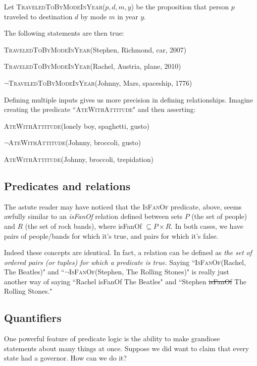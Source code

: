 \quad\quad Let \textsc{TraveledToByModeInYear}($p,d,m,y$) be the
proposition that person $p$ traveled to destination $d$ by mode $m$ in year
$y$.

The following statements are then true:
\begin{center}
\textsc{TraveledToByModeInYear}(Stephen, Richmond, car, 2007) 

\textsc{TraveledToByModeInYear}(Rachel, Austria, plane, 2010) 

$\neg$\textsc{TraveledToByModeInYear}(Johnny, Mars, spaceship, 1776) 
\end{center}

Defining multiple inputs gives us more precision in defining relationships.
Imagine creating the predicate ``\textsc{AteWithAttitude}" and then
asserting:
\begin{center}
\textsc{AteWithAttitude}(lonely boy, spaghetti, gusto)

$\neg$\textsc{AteWithAttitude}(Johnny, broccoli, gusto)

\textsc{AteWithAttitude}(Johnny, broccoli, trepidation)
\end{center}


\subsection{Predicates and relations}

The astute reader may have noticed that the \textsc{IsFanOf} predicate,
above, seems awfully similar to an \textsl{isFanOf} relation defined
between sets $P$ (the set of people) and $R$ (the set of rock bands), where
isFanOf $\subseteq P \times R$. In both cases, we have pairs of people/bands
for which it's true, and pairs for which it's false.

Indeed these concepts are identical. In fact, a relation can be defined as
\textit{the set of ordered pairs (or tuples) for which a predicate is
true.} Saying ``\textsc{IsFanOf}(Rachel, The Beatles)" and
``$\neg$\textsc{IsFanOf}(Stephen, The Rolling Stones)" is really just
another way of saying ``Rachel isFanOf The Beatles" and ``Stephen
\sout{isFanOf} The Rolling Stones."
 

\subsection{Quantifiers}

One powerful feature of predicate logic is the ability to make grandiose
statements about many things at once. Suppose we did want to claim that
every state had a governor. How can we do it?

